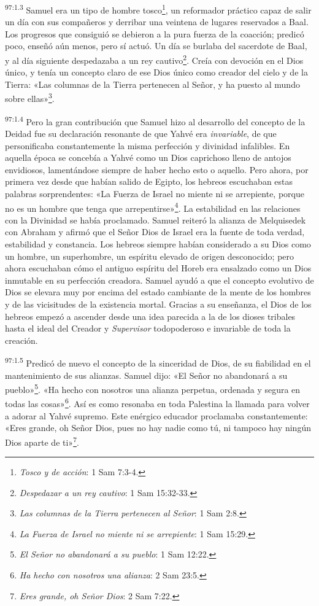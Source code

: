 \par
\textsuperscript{97:1.3} Samuel era un tipo de hombre tosco\footnote{\textit{Tosco y de acción}: 1 Sam 7:3-4.}, un reformador práctico capaz de salir un día con sus compañeros y derribar una veintena de lugares reservados a Baal. Los progresos que consiguió se debieron a la pura fuerza de la coacción; predicó poco, enseñó aún menos, pero sí actuó. Un día se burlaba del sacerdote de Baal, y al día siguiente despedazaba a un rey cautivo\footnote{\textit{Despedazar a un rey cautivo}: 1 Sam 15:32-33.}. Creía con devoción en el Dios único, y tenía un concepto claro de ese Dios único como creador del cielo y de la Tierra: «Las columnas de la Tierra pertenecen al Señor, y ha puesto al mundo sobre ellas»\footnote{\textit{Las columnas de la Tierra pertenecen al Señor}: 1 Sam 2:8.}.

\par
\textsuperscript{97:1.4} Pero la gran contribución que Samuel hizo al desarrollo del concepto de la Deidad fue su declaración resonante de que Yahvé era \textit{invariable}, de que personificaba constantemente la misma perfección y divinidad infalibles. En aquella época se concebía a Yahvé como un Dios caprichoso lleno de antojos envidiosos, lamentándose siempre de haber hecho esto o aquello. Pero ahora, por primera vez desde que habían salido de Egipto, los hebreos escuchaban estas palabras sorprendentes: «La Fuerza de Israel no miente ni se arrepiente, porque no es un hombre que tenga que arrepentirse»\footnote{\textit{La Fuerza de Israel no miente ni se arrepiente}: 1 Sam 15:29.}. La estabilidad en las relaciones con la Divinidad se había proclamado. Samuel reiteró la alianza de Melquisedek con Abraham y afirmó que el Señor Dios de Israel era la fuente de toda verdad, estabilidad y constancia. Los hebreos siempre habían considerado a su Dios como un hombre, un superhombre, un espíritu elevado de origen desconocido; pero ahora escuchaban cómo el antiguo espíritu del Horeb era ensalzado como un Dios inmutable en su perfección creadora. Samuel ayudó a que el concepto evolutivo de Dios se elevara muy por encima del estado cambiante de la mente de los hombres y de las vicisitudes de la existencia mortal. Gracias a su enseñanza, el Dios de los hebreos empezó a ascender desde una idea parecida a la de los dioses tribales hasta el ideal del Creador y \textit{Supervisor} todopoderoso e invariable de toda la creación.

\par
\textsuperscript{97:1.5} Predicó de nuevo el concepto de la sinceridad de Dios, de su fiabilidad en el mantenimiento de sus alianzas. Samuel dijo: «El Señor no abandonará a su pueblo»\footnote{\textit{El Señor no abandonará a su pueblo}: 1 Sam 12:22.}. «Ha hecho con nosotros una alianza perpetua, ordenada y segura en todas las cosas»\footnote{\textit{Ha hecho con nosotros una alianza}: 2 Sam 23:5.}. Así es como resonaba en toda Palestina la llamada para volver a adorar al Yahvé supremo. Este enérgico educador proclamaba constantemente: «Eres grande, oh Señor Dios, pues no hay nadie como tú, ni tampoco hay ningún Dios aparte de ti»\footnote{\textit{Eres grande, oh Señor Dios}: 2 Sam 7:22.}.

